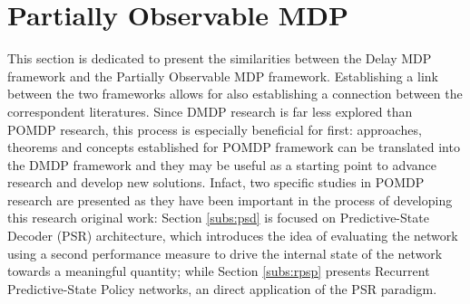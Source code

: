     \newpage
    \section{Partially Observable MDP}
        \label{sota:pomdp}
        
        This section is dedicated to present the similarities between the Delay MDP framework and the Partially Observable MDP framework. Establishing a link between the two frameworks allows for also establishing a connection between the correspondent literatures. Since DMDP research is far less explored than POMDP research, this process is especially beneficial for first: approaches, theorems and concepts established for POMDP framework can be translated into the DMDP framework and they may be useful as a starting point to advance research and develop new solutions. Infact, two specific studies in POMDP research are presented as they have been important in the process of developing this research original work: Section \ref{subs:psd} is focused on Predictive-State Decoder (PSR) architecture, which introduces the idea of evaluating the network using a second performance measure to drive the internal state of the network towards a meaningful quantity; while Section \ref{subs:rpsp} presents Recurrent Predictive-State Policy networks, an direct application of the PSR paradigm.
        
